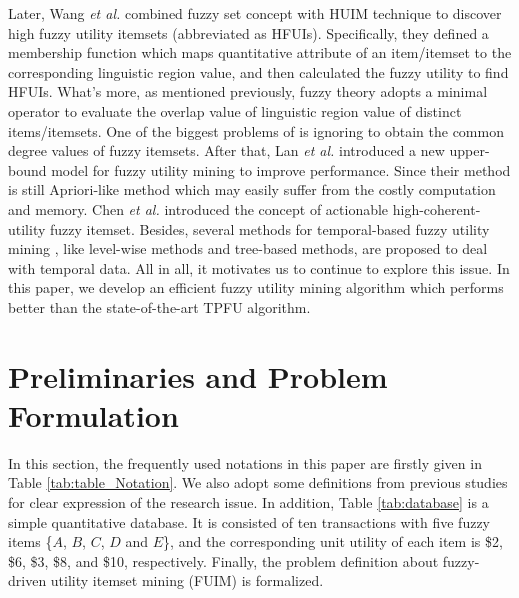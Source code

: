 \documentclass[journal]{IEEEtran}
\begin{document}
Later, Wang \textit{et al.} \cite{wang2009fuzzy} combined fuzzy set concept with HUIM technique to discover high fuzzy utility itemsets (abbreviated as HFUIs). Specifically, they defined a membership function which maps quantitative attribute of an item/itemset to the corresponding linguistic region value, and then calculated the fuzzy utility to find HFUIs. What's more, as mentioned previously, fuzzy theory adopts a minimal operator to evaluate the overlap value of linguistic region value of distinct items/itemsets. One of the biggest problems of \cite{wang2009fuzzy} is ignoring to obtain the common degree values of fuzzy itemsets. After that, Lan \textit{et al.} \cite{lan2015fuzzy} introduced a new upper-bound model for fuzzy utility mining to improve performance. Since their method is still Apriori-like method which may easily suffer from the costly computation and memory. Chen \textit{et al.} \cite{chen2014actionable} introduced the concept of actionable high-coherent-utility fuzzy itemset. Besides, several methods for temporal-based fuzzy utility mining \cite{hong2020one,huang2017temporal}, like level-wise methods and tree-based methods, are proposed to deal with temporal data. All in all, it motivates us to continue to explore this issue. In this paper, we develop an efficient fuzzy utility mining algorithm which performs better than the state-of-the-art TPFU algorithm.



\section{Preliminaries and Problem Formulation}
\label{sec:preliminaries}

In this section, the frequently used notations in this paper are firstly given in Table \ref{tab:table_Notation}. We also adopt some definitions from previous studies \cite{lan2015fuzzy,chen2014actionable} for clear expression of the research issue. In addition, Table \ref{tab:database} is a simple quantitative database. It is consisted of ten transactions with five fuzzy items \{$A$, $B$, $C$, $D$ and $E$\}, and the corresponding unit utility of each item is \$2, \$6, \$3, \$8, and \$10, respectively. Finally, the problem definition about fuzzy-driven utility itemset mining (FUIM) is formalized.
\end{document}
